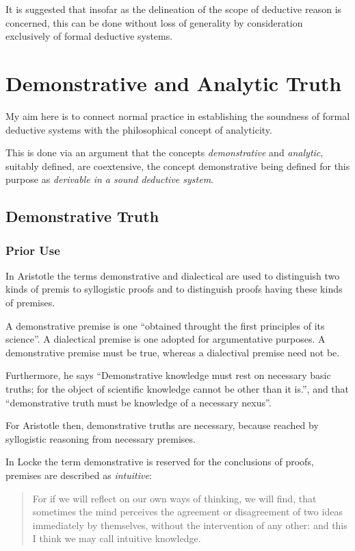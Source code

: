 \documentclass[numreferences]{rbjk}
\begin{document}
\begin{article}
It is suggested that insofar as the delineation of the scope of deductive reason is concerned, this can be done without loss of generality by consideration exclusively of formal deductive systems.

\section{Demonstrative and Analytic Truth}

My aim here is to connect normal practice in establishing the soundness of formal deductive systems with the philosophical concept of analyticity.

This is done via an argument that the concepts {\it demonstrative} and {\it analytic}, suitably defined, are coextensive, the concept demonstrative being defined for this purpose as {\it derivable in a sound deductive system}.

\subsection{Demonstrative Truth}

\subsubsection{Prior Use}

In Aristotle the terms demonstrative and dialectical are used to distinguish two kinds of premis to syllogistic proofs and to distinguish proofs having these kinds of premises.

A demonstrative premise is one ``obtained throught the first principles of its science''.
A dialectical premise is one adopted for argumentative purposes.
A demonstrative premise must be true, whereas a dialectival premise need not be.
 
Furthermore, he says ``Demonstrative knowledge must rest on necessary basic truths; for the object of scientific knowledge cannot be other than it is.'', and that ``demonstrative truth must be knowledge of a necessary nexus''.

For Aristotle then, demonstrative truths are necessary, because reached by syllogistic reasoning from necessary premises.

In Locke the term demonstrative is reserved for the conclusions of proofs, premises are described as {\it intuitive}:

\begin{quote}
For if we will reflect on our own ways of thinking, we will find, that sometimes the mind perceives the agreement or disagreement of two ideas immediately by themselves, without the intervention of any other: and this I think we may call intuitive knowledge.
\end{quote}


\end{article}
\end{document}
